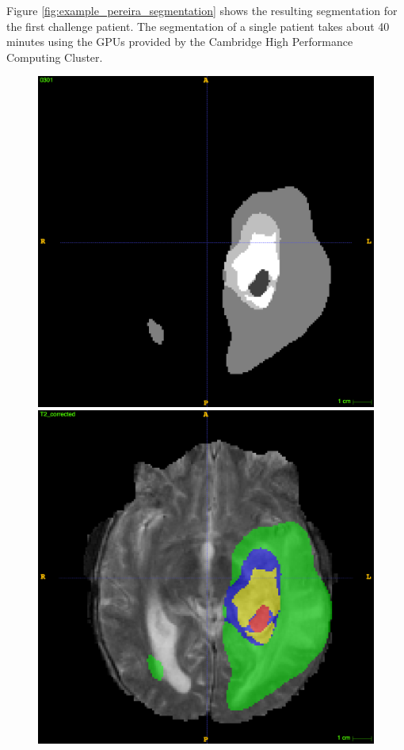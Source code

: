 \documentclass[12pt,a4paper,twoside,openright]{report}
\begin{document}
Figure \ref{fig:example_pereira_segmentation} shows the resulting segmentation for the first challenge patient. The segmentation of a single patient takes about 40 minutes using the GPUs provided by the Cambridge High Performance Computing Cluster.

\begin{figure}
	\centering
	\includegraphics[scale = 0.1]{challenge_1_segmentation_66}
	\includegraphics[scale = 0.1]{challenge_1_segmentation_with_T2_66}

\end{figure}
\end{document}
